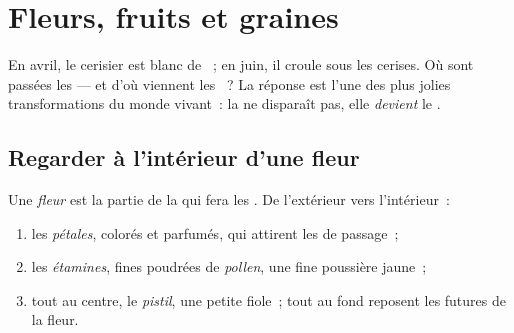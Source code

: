 \chapter{Fleurs, fruits et graines}\label{ch:g3:flowers-fruits-seeds}

En avril, le cerisier est blanc de ~; en juin, il croule sous
les cerises. Où sont passées les  --- et d'où viennent les
~? La réponse est l'une des plus jolies transformations du
monde vivant~: la  ne disparaît pas, elle \emph{devient} le
.

\section{Regarder à l'intérieur d'une fleur}

\begin{definition}\label{def:g3:flowers-fruits-seeds:parts}
Une \emph{fleur} est la partie de la  qui fera
les . De l'extérieur vers l'intérieur~:
\begin{enumerate}
  \item les \emph{pétales}, colorés et parfumés, qui
        attirent les  de passage~;
  \item les \emph{étamines}, fines  poudrées de
        \emph{pollen}, une fine poussière jaune~;
  \item tout au centre, le \emph{pistil}, une petite
        fiole~; tout au fond reposent les futures  de la
        fleur.
\end{enumerate}
\end{definition}

